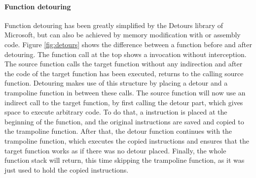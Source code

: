 \paragraph{Function detouring}

Function detouring has been greatly simplified by the Detours\cite{msdetours} library of Microsoft, but can also be achieved by memory modification with  or assembly code. Figure \ref{fig:detours} shows the difference between a function before and after detouring. The function call at the top shows a invocation without interception. The source function calls the target function without any indirection and after the code of the target function has been executed, returns to the calling source function. Detouring makes use of this structure by placing a detour and a trampoline function in between these calls. The source function will now use an indirect call to the target function, by first calling the detour part, which gives space to execute arbitrary code. To do that, a  instruction is placed at the beginning of the function, and the original instructions are saved and copied to the trampoline function. After that, the detour function continues with the trampoline function, which executes the copied instructions and ensures that the target function works as if there was no detour placed. Finally, the whole function stack will return, this time skipping the trampoline function, as it was just used to hold the copied instructions.